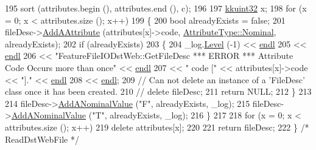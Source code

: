 \begin{DoxyCode}
195   sort (attributes.begin (), attributes.end (), c);
196 
197   \hyperlink{namespace_k_k_b_af8d832f05c54994a1cce25bd5743e19a}{kkuint32}  x;
198   \textcolor{keywordflow}{for}  (x = 0;  x < attributes.size ();  x++)
199   \{
200     \textcolor{keywordtype}{bool}  alreadyExists = \textcolor{keyword}{false};
201     fileDesc->\hyperlink{class_k_k_m_l_l_1_1_file_desc_ab920163b3e6155197bfc1bf2045555ca}{AddAAttribute} (attributes[x]->code, 
      \hyperlink{namespace_k_k_m_l_l_a99973706982b59debba670e2480555aba8c28d7c312116b8a46e2f466cb33d5b4}{AttributeType::Nominal}, alreadyExists);
202     \textcolor{keywordflow}{if}  (alreadyExists)
203     \{
204       \_log.\hyperlink{class_k_k_b_1_1_run_log_a32cf761d7f2e747465fd80533fdbb659}{Level} (-1) << \hyperlink{namespace_k_k_b_ad1f50f65af6adc8fa9e6f62d007818a8}{endl}
205                       << \hyperlink{namespace_k_k_b_ad1f50f65af6adc8fa9e6f62d007818a8}{endl}
206                       << \textcolor{stringliteral}{"FeatureFileIODstWeb::GetFileDesc    *** ERROR ***    Attribute Code Occurs more
       than once"} << \hyperlink{namespace_k_k_b_ad1f50f65af6adc8fa9e6f62d007818a8}{endl}
207                       << \textcolor{stringliteral}{"    code ["} << attributes[x]->code << \textcolor{stringliteral}{"]."} << \hyperlink{namespace_k_k_b_ad1f50f65af6adc8fa9e6f62d007818a8}{endl}
208                       << \hyperlink{namespace_k_k_b_ad1f50f65af6adc8fa9e6f62d007818a8}{endl};
209       \textcolor{comment}{// Can not delete an instance of a 'FileDesc' class once it has been created.}
210       \textcolor{comment}{// delete  fileDesc;}
211       \textcolor{keywordflow}{return} NULL;
212     \}
213 
214     fileDesc->\hyperlink{class_k_k_m_l_l_1_1_file_desc_a097d8903e7dd97fc4efa66b4293b6f4d}{AddANominalValue} (\textcolor{stringliteral}{"F"}, alreadyExists, \_log);
215     fileDesc->\hyperlink{class_k_k_m_l_l_1_1_file_desc_a097d8903e7dd97fc4efa66b4293b6f4d}{AddANominalValue} (\textcolor{stringliteral}{"T"}, alreadyExists, \_log);
216   \}
217 
218   \textcolor{keywordflow}{for}  (x = 0;  x < attributes.size ();  x++)
219     \textcolor{keyword}{delete} attributes[x];
220 
221   \textcolor{keywordflow}{return}  fileDesc;
222 \}  \textcolor{comment}{/* ReadDstWebFile */}
\end{DoxyCode}
